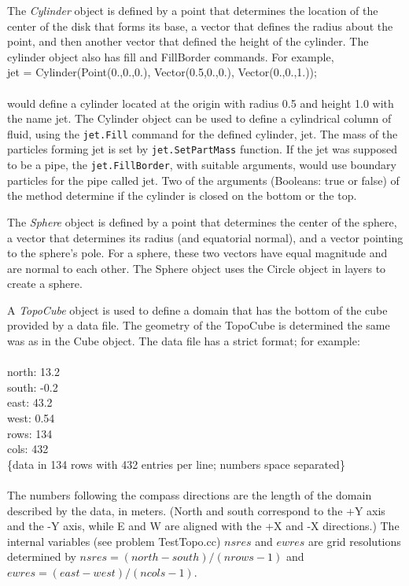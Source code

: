 \documentclass{../GPUSPHtemplate}
\begin{document}
The {\em Cylinder} object is defined by a point that determines the
location of the center of the disk that forms its base, a vector that
defines the radius about the point, and then another vector that defined
the height of the cylinder. The cylinder object also has fill and
FillBorder commands. For example, \\

jet = Cylinder(Point(0.,0.,0.), Vector(0.5,0.,0.), Vector(0.,0.,1.));\\
\\would define a cylinder located at the origin with radius 0.5 and
height 1.0 with the name jet. The Cylinder object can be used to
define a cylindrical column of fluid, using the \verb!jet.Fill!
command for the defined cylinder, jet. The mass of the particles
forming jet is set by \verb!jet.SetPartMass! function. If the jet was
supposed to be a pipe, the \verb!jet.FillBorder!, with suitable
arguments, would use boundary particles for the pipe called jet. Two
of the arguments (Booleans: true or false) of the method determine if
the cylinder is closed on the bottom or the top.

The {\em Sphere} object is defined by a point that determines the center
of the sphere, a vector that determines its radius (and equatorial
normal), and a vector pointing to the sphere's pole. For a sphere,
these two vectors have equal magnitude and are normal to each other.
The Sphere object uses the Circle object in layers to create a sphere.

A {\em TopoCube} object is used to define a domain that has the bottom
of the cube provided by a data file. The geometry of the TopoCube is
determined the same was as in the Cube object. The data file has a
strict format; for example: \\\\ north: 13.2 \\ south: -0.2\\ east:
43.2 \\ west: 0.54 \\ rows: 134\\ cols: 432 \\ \{data in 134 rows
with 432 entries per line; numbers space separated\}\\ \\ The numbers
following the compass directions are the length of the domain described
by the data, in meters. (North and south correspond to the +Y axis and
the -Y axis, while E and W are aligned with the +X and -X directions.)
The internal variables (see problem TestTopo.cc) $nsres$ and $ewres$ are
grid resolutions determined by $nsres= (north-south)/(nrows-1)$ and
$ewres= (east -west)/(ncols-1)$.
\end{document}
